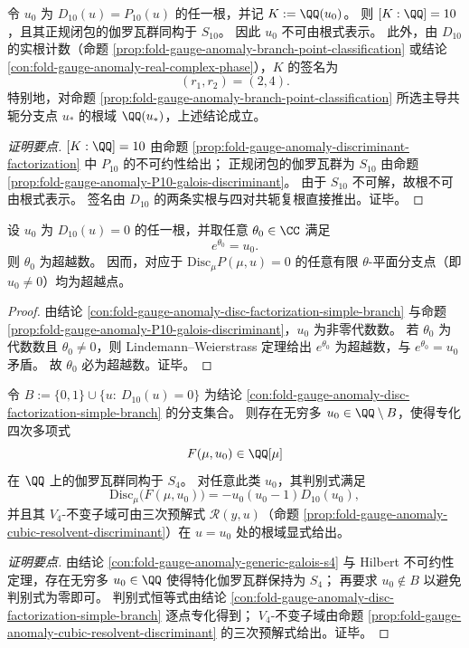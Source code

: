 \begin{conclusion}[十次分歧根域的签名与不可根式性]\label{con:fold-gauge-anomaly-P10-rootfield-signature-nonradical}
令 \(u_0\) 为 \(D_{10}(u)=P_{10}(u)\) 的任一根，并记 \(K:=\QQ(u_0)\)。
则 \([K:\QQ]=10\)，且其正规闭包的伽罗瓦群同构于 \(S_{10}\)。
因此 \(u_0\) 不可由根式表示。
此外，由 \(D_{10}\) 的实根计数（命题 \ref{prop:fold-gauge-anomaly-branch-point-classification} 或结论 \ref{con:fold-gauge-anomaly-real-complex-phase}），\(K\) 的签名为
\[
(r_1,r_2)=(2,4).
\]
特别地，对命题 \ref{prop:fold-gauge-anomaly-branch-point-classification} 所选主导共轭分支点 \(u_\ast\) 的根域 \(\QQ(u_\ast)\)，上述结论成立。
\end{conclusion}
\begin{proof}[证明要点]
\([K:\QQ]=10\) 由命题 \ref{prop:fold-gauge-anomaly-discriminant-factorization} 中 \(P_{10}\) 的不可约性给出；
正规闭包的伽罗瓦群为 \(S_{10}\) 由命题 \ref{prop:fold-gauge-anomaly-P10-galois-discriminant}。
由于 \(S_{10}\) 不可解，故根不可由根式表示。
签名由 \(D_{10}\) 的两条实根与四对共轭复根直接推出。证毕。
\end{proof}

\begin{conclusion}[分支点对数参数的超越性]\label{con:fold-gauge-anomaly-log-transcendence}
设 \(u_0\) 为 \(D_{10}(u)=0\) 的任一根，并取任意 \(\theta_0\in\CC\) 满足
\[
e^{\theta_0}=u_0.
\]
则 \(\theta_0\) 为超越数。
因而，对应于 \(\mathrm{Disc}_{\mu}P(\mu,u)=0\) 的任意有限 \(\theta\)-平面分支点（即 \(u_0\neq0\)）均为超越点。
\end{conclusion}
\begin{proof}
由结论 \ref{con:fold-gauge-anomaly-disc-factorization-simple-branch} 与命题 \ref{prop:fold-gauge-anomaly-P10-galois-discriminant}，\(u_0\) 为非零代数数。
若 \(\theta_0\) 为代数数且 \(\theta_0\neq0\)，则 Lindemann--Weierstrass 定理给出 \(e^{\theta_0}\) 为超越数，与 \(e^{\theta_0}=u_0\) 矛盾。
故 \(\theta_0\) 必为超越数。证毕。
\end{proof}

\begin{conclusion}\label{con:fold-gauge-anomaly-s4-number-fields-specialization}
令 \(B:=\{0,1\}\cup\{u:\ D_{10}(u)=0\}\) 为结论 \ref{con:fold-gauge-anomaly-disc-factorization-simple-branch} 的分支集合。
则存在无穷多 \(u_0\in\QQ\setminus B\)，使得专化四次多项式
\[
F(\mu,u_0)\in\QQ[\mu]
\]
在 \(\QQ\) 上的伽罗瓦群同构于 \(S_4\)。
对任意此类 \(u_0\)，其判别式满足
\[
\mathrm{Disc}_{\mu}\bigl(F(\mu,u_0)\bigr)=-u_0(u_0-1)D_{10}(u_0),
\]
并且其 \(V_4\)-不变子域可由三次预解式 \(\mathcal R(y,u)\)（命题 \ref{prop:fold-gauge-anomaly-cubic-resolvent-discriminant}）在 \(u=u_0\) 处的根域显式给出。
\end{conclusion}
\begin{proof}[证明要点]
由结论 \ref{con:fold-gauge-anomaly-generic-galois-s4} 与 Hilbert 不可约性定理，存在无穷多 \(u_0\in\QQ\) 使得特化伽罗瓦群保持为 \(S_4\)；
再要求 \(u_0\notin B\) 以避免判别式为零即可。
判别式恒等式由结论 \ref{con:fold-gauge-anomaly-disc-factorization-simple-branch} 逐点专化得到；
\(V_4\)-不变子域由命题 \ref{prop:fold-gauge-anomaly-cubic-resolvent-discriminant} 的三次预解式给出。证毕。
\end{proof}

